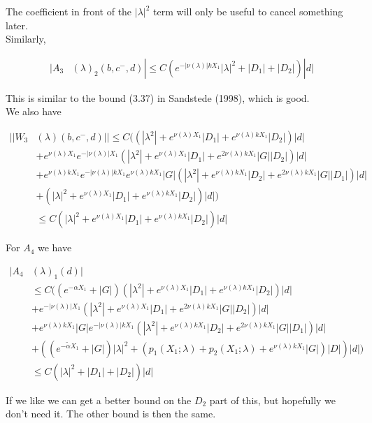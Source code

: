 \documentclass[12pt]{article}
\begin{document}
\begin{enumerate}
The coefficient in front of the $|\lambda|^2$ term will only be useful to cancel something later.\\

Similarly, 

\begin{align*}
|A_3&(\lambda)_2(b, c^-, d)| \leq C( e^{-|\nu(\lambda)| k X_1} |\lambda|^2 + |D_1| + |D_2|) |d|
\end{align*}

This is similar to the bound (3.37) in Sandstede (1998), which is good.\\

We also have

\begin{align*}
||W_3&(\lambda)(b,c^-,d)|| \leq C( (|\lambda^2| + e^{\nu(\lambda) X_1}|D_1| + e^{\nu(\lambda)k X_1}|D_2|)|d| \\
&+ e^{\nu(\lambda) X_1} e^{-|\nu(\lambda)| X_1}(|\lambda^2| + e^{\nu(\lambda) X_1}|D_1| + e^{2 \nu(\lambda)k X_1}|G||D_2|)|d| \\
&+ e^{\nu(\lambda) k X_1} e^{-|\nu(\lambda)| k X_1} e^{\nu(\lambda)k X_1} |G| (|\lambda^2| + e^{\nu(\lambda)k X_1}|D_2| + e^{2 \nu(\lambda)k X_1}|G||D_1|)|d|\\
&+ (|\lambda|^2 + e^{\nu(\lambda) X_1} |D_1| + e^{\nu(\lambda)k X_1}|D_2|) |d| )\\
&\leq C ( |\lambda|^2 + e^{\nu(\lambda) X_1} |D_1| + e^{\nu(\lambda)k X_1} |D_2| )|d|
\end{align*}

For $A_4$ we have

\begin{align*}
|A_4&(\lambda)_1(d)| \\
&\leq C( (e^{-\alpha X_1} + |G|) (|\lambda^2| + e^{\nu(\lambda) X_1}|D_1| + e^{\nu(\lambda)k X_1}|D_2|)|d| \\
&+ e^{-|\nu(\lambda)| X_1} (|\lambda^2| + e^{\nu(\lambda) X_1}|D_1| + e^{2 \nu(\lambda)k X_1}|G||D_2|)|d|\\
&+ e^{\nu(\lambda) k X_1} |G| e^{-|\nu(\lambda)| k X_1} (|\lambda^2| + e^{\nu(\lambda)k X_1}|D_2| + e^{2 \nu(\lambda)k X_1}|G||D_1|)|d|\\
&+ ((e^{-\tilde{\alpha} X_1} + |G|) |\lambda|^2 + (p_1(X_1; \lambda) + p_2(X_1; \lambda) + e^{\nu(\lambda)k X_1} |G|)|D|)|d| ) \\
&\leq C(|\lambda|^2 + |D_1| + |D_2| )|d|
\end{align*}

If we like we can get a better bound on the $D_2$ part of this, but hopefully we don't need it. The other bound is then the same.


\end{enumerate}
\end{document}

